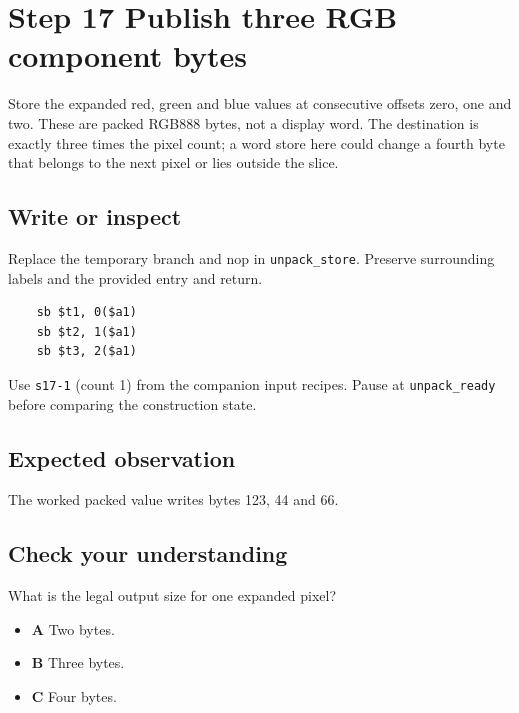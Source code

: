 \section{Step 17 Publish three RGB component bytes}\label{rgb-s17}

Store the expanded red, green and blue values at consecutive offsets zero, one and two. These are packed RGB888 bytes, not a display word. The destination is exactly three times the pixel count; a word store here could change a fourth byte that belongs to the next pixel or lies outside the slice.

\subsection{Write or inspect}
Replace the temporary branch and nop in \texttt{unpack\_store}. Preserve surrounding labels and the provided entry and return.

\begin{verbatim}
    sb $t1, 0($a1)
    sb $t2, 1($a1)
    sb $t3, 2($a1)
\end{verbatim}
Use \texttt{s17-1} (count 1) from the companion input recipes. Pause at \texttt{unpack\_ready} before comparing the construction state.

\subsection{Expected observation}
The worked packed value writes bytes 123, 44 and 66.

\subsection{Check your understanding}
What is the legal output size for one expanded pixel?

\begin{itemize}
  \item \textbf{A} Two bytes.
  \item \textbf{B} Three bytes.
  \item \textbf{C} Four bytes.
\end{itemize}
